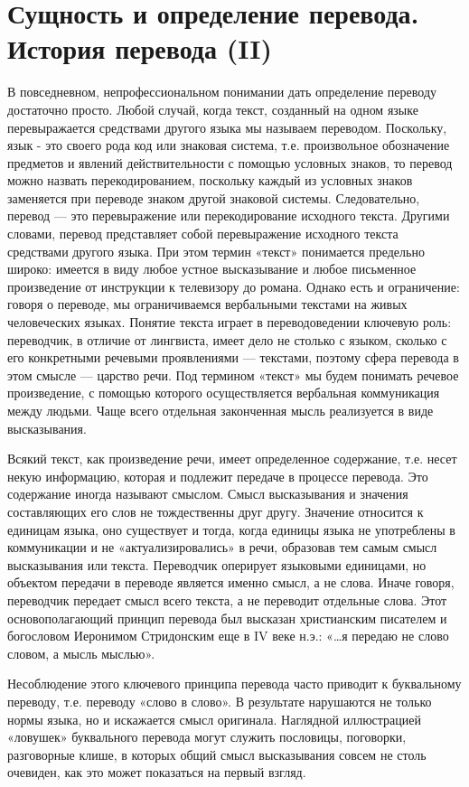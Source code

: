 \section{Сущность и определение перевода. История перевода (II)}

В повседневном, непрофессиональном понимании дать определение переводу достаточно просто. Любой случай, когда текст, созданный на одном языке перевыражается средствами другого языка мы называем переводом. Поскольку, язык - это своего рода код или знаковая система, т.е. произвольное обозначение предметов и явлений действительности с помощью условных знаков, то перевод можно назвать перекодированием, поскольку каждый из условных знаков заменяется при переводе знаком другой знаковой системы. Следовательно, перевод --- это перевыражение или перекодирование исходного текста. Другими словами, перевод представляет собой перевыражение исходного текста средствами другого языка. При этом термин «текст» понимается предельно широко: имеется в виду любое устное высказывание и любое письменное произведение от инструкции к телевизору до романа. Однако есть и ограничение: говоря о переводе, мы ограничиваемся вербальными текстами на живых человеческих языках. Понятие текста играет в переводоведении ключевую роль: переводчик, в отличие от лингвиста, имеет дело не столько с языком, сколько с его конкретными речевыми проявлениями --- текстами, поэтому сфера перевода в этом смысле --- царство речи. Под термином «текст» мы будем понимать речевое произведение, с помощью которого осуществляется вербальная коммуникация между людьми. Чаще всего отдельная законченная мысль реализуется в виде высказывания.

Всякий текст, как произведение речи, имеет определенное содержание, т.е. несет некую информацию, которая и подлежит передаче в процессе перевода. Это содержание иногда называют смыслом. Смысл высказывания и значения составляющих его слов не тождественны друг другу. Значение относится к единицам языка, оно существует и тогда, когда единицы языка не употреблены в коммуникации и не «актуализировались» в речи, образовав тем самым смысл высказывания или текста. Переводчик оперирует языковыми единицами, но объектом передачи в переводе является именно смысл, а не слова. Иначе говоря, переводчик передает смысл всего текста, а не переводит отдельные слова. Этот основополагающий принцип перевода был высказан христианским писателем и богословом Иеронимом Стридонским еще в IV веке н.э.: «…я передаю не слово словом, а мысль мыслью».

Несоблюдение этого ключевого принципа перевода часто приводит к буквальному переводу, т.е. переводу «слово в слово». В результате нарушаются не только нормы языка, но и искажается смысл оригинала. Наглядной иллюстрацией «ловушек» буквального перевода могут служить пословицы, поговорки, разговорные клише, в которых общий смысл высказывания совсем не столь очевиден, как это может показаться на первый взгляд.

